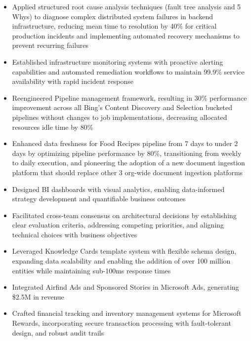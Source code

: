\begin{itemize}
    \item \small{Applied structured root cause analysis techniques (fault tree analysis and 5 Whys) to diagnose complex
        distributed system failures in backend infrastructure, reducing mean time to resolution by 40\% for critical
        production incidents and implementing automated recovery mechanisms to prevent recurring failures}

    \item \small{Established infrastructure monitoring systems with proactive alerting capabilities and automated
        remediation workflows to maintain 99.9\% service availability with rapid incident response}

    \item \small{Reengineered Pipeline management framework, resulting in 30\% performance improvement across all
        Bing's Content Discovery and Selection bucketed pipelines without changes to job implementations, decreasing
        allocated resources idle time by 80\%}

    \item \small{Enhanced data freshness for Food Recipes pipeline from 7 days to under 2 days by
        optimizing pipeline performance by 80\%, transitioning from weekly to daily execution, and pioneering
        the adoption of a new document ingestion platform that should replace other 3 org-wide document ingestion 
        platforms}

    \item \small{Designed BI dashboards with visual analytics, enabling data-informed strategy development and 
        quantifiable business outcomes}

    \item \small{Facilitated cross-team consensus on architectural decisions by establishing clear evaluation 
        criteria, addressing competing priorities, and aligning technical choices with business objectives}

    \item \small{Leveraged Knowledge Cards template system with flexible schema design, expanding data scalability
        and enabling the addition of over 100 million entities while maintaining sub-100ms response times}

    \item \small{Integrated Airfind Ads and Sponsored Stories in Microsoft Ads, generating \$2.5M in revenue}

    \item \small{Crafted financial tracking and inventory management systems for Microsoft Rewards, incorporating
        secure transaction processing with fault-tolerant design, and robust audit trails}

\end{itemize}